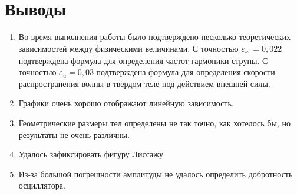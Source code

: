 \documentclass[13pt,a4paper]{article}
\begin{document}
\section{Выводы}
\begin{enumerate}
\item Во время выполнения работы было подтверждено несколько теоретических зависимостей между физическими величинами. С точностью $\varepsilon_{\nu_{1}} = 0,022$ подтверждена формула для определения частот гармоники струны. С точностью  $\overline{\varepsilon_{u}} = 0,03$ подтверждена формула для определения скорости распространения волны в твердом теле под действием внешней силы.
\item Графики очень хорошо отображают линейную зависимость.
\item Геометрические размеры тел определены не так точно, как хотелось бы, но результаты не очень различны.
\item Удалось зафиксировать фигуру Лиссажу 
\item Из-за большой погрешности амплитуды не удалось определить добротность осциллятора. 
\end{enumerate}	
\end{document}

